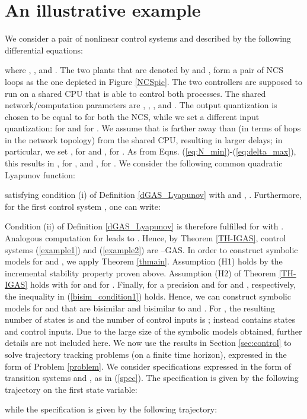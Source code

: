 \documentclass{amsart}
\begin{document}
\section{An illustrative example}\label{sec:example}
We consider a pair of nonlinear control systems  and  described by the following differential equations:  

where , ,  and . The two plants that are denoted by  and , form a pair of NCS loops as the one depicted in Figure \ref{NCSpic}. 
The two controllers are supposed to run on a shared CPU that is able to control both processes. The shared network/computation parameters are , , ,  and .
The output quantization is chosen to be equal to  for both the NCS, while we set a different input quantization:  for  and  for . We assume that  is farther away than  (in terms of hops in the network topology) from the shared CPU, resulting in larger delays; in particular, we set ,  for  and ,  for . As from Eqns. (\ref{eq:N_min})-(\ref{eq:delta_max}), this results in ,  for , and ,  for .
We consider the following common quadratic Lyapunov function:

satisfying condition (i) of Definition \ref{dGAS_Lyapunov} with  and , . Furthermore, for the first control system , one can write:

Condition (ii) of Definition \ref{dGAS_Lyapunov} is therefore fulfilled for  with . Analogous computation for  leads to . Hence, by Theorem \ref{TH-IGAS}, control systems (\ref{example1}) and (\ref{example2}) are --GAS. 
In order to construct symbolic models for  and , we apply Theorem \ref{thmain}. Assumption (H1) holds by the incremental stability property proven above. Assumption (H2) of Theorem \ref{TH-IGAS} holds with  for  and  for . Finally, for a precision  and  for  and , respectively, the inequality in (\ref{bisim_condition1}) holds. Hence, we can construct symbolic models for  and  that are  bisimilar and  bisimilar to  and . For , the resulting number of states is  and the number of control inputs is ;  instead contains  states and  control inputs.
Due to the large size of the symbolic models obtained, further details are not included here. 
We now use the results in Section \ref{sec:control} to solve trajectory tracking problems (on a finite time horizon), expressed in the form of Problem \ref{problem}. We consider specifications expressed in the form of transition systems  and , as in (\ref{spec}). The specification  is given by the following trajectory on the first state variable:

while the specification  is given by the following trajectory:
\end{document}
